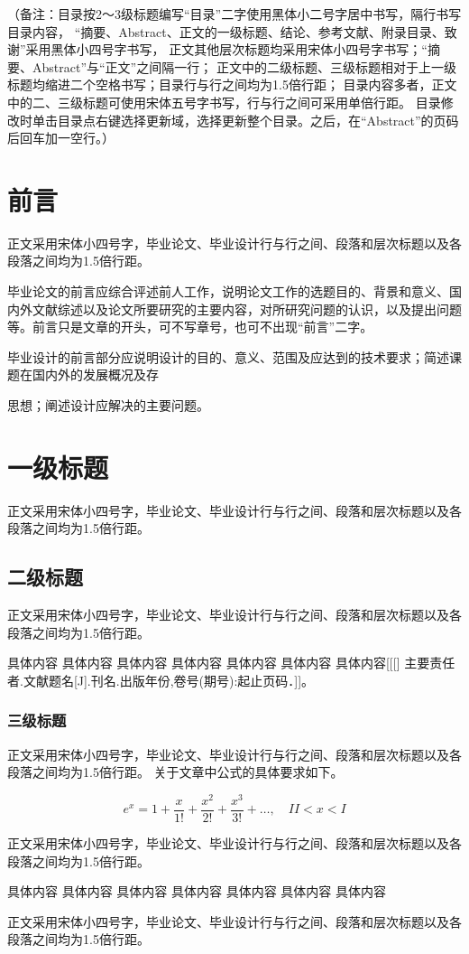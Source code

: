 \documentclass{sicnuthesis}
\begin{document}
\tableofcontents

（备注：目录按2～3级标题编写“目录”二字使用黑体小二号字居中书写，隔行书写目录内容，
“摘要、Abstract、正文的一级标题、结论、参考文献、附录目录、致谢”采用黑体小四号字书写，
正文其他层次标题均采用宋体小四号字书写；“摘要、Abstract”与“正文”之间隔一行；
正文中的二级标题、三级标题相对于上一级标题均缩进二个空格书写；目录行与行之间均为1.5倍行距；
目录内容多者，正文中的二、三级标题可使用宋体五号字书写，行与行之间可采用单倍行距。
目录修改时单击目录点右键选择更新域，选择更新整个目录。之后，在“Abstract”的页码后回车加一空行。）

\newpage

\section{前言}

正文采用宋体小四号字，毕业论文、毕业设计行与行之间、段落和层次标题以及各段落之间均为1.5倍行距。

毕业论文的前言应综合评述前人工作，说明论文工作的选题目的、背景和意义、国内外文献综述以及论文所要研究的主要内容，对所研究问题的认识，以及提出问题等。前言只是文章的开头，可不写章号，也可不出现“前言”二字。

毕业设计的前言部分应说明设计的目的、意义、范围及应达到的技术要求；简述课题在国内外的发展概况及存

思想；阐述设计应解决的主要问题。

\section{一级标题}

正文采用宋体小四号字，毕业论文、毕业设计行与行之间、段落和层次标题以及各段落之间均为1.5倍行距。

\subsection{二级标题}

正文采用宋体小四号字，毕业论文、毕业设计行与行之间、段落和层次标题以及各段落之间均为1.5倍行距。

具体内容 具体内容 具体内容 具体内容 具体内容 具体内容 具体内容[[[] 主要责任者.文献题名[J].刊名.出版年份,卷号(期号):起止页码．]]。

\subsubsection{三级标题}

正文采用宋体小四号字，毕业论文、毕业设计行与行之间、段落和层次标题以及各段落之间均为1.5倍行距。
关于文章中公式的具体要求如下。

\begin{equation}
e^x = 1 + \frac{x}{1!} + \frac{x^2}{2!} + \frac{x^3}{3!} + \dots, \quad II < x < I
\end{equation}

正文采用宋体小四号字，毕业论文、毕业设计行与行之间、段落和层次标题以及各段落之间均为1.5倍行距。

具体内容 具体内容 具体内容 具体内容 具体内容 具体内容 具体内容

正文采用宋体小四号字，毕业论文、毕业设计行与行之间、段落和层次标题以及各段落之间均为1.5倍行距。
\end{document}
